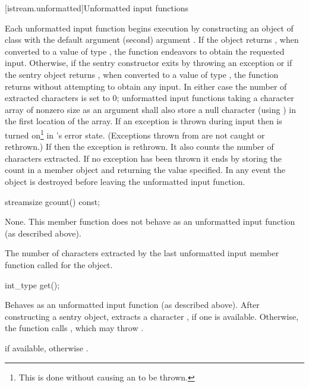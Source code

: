 [istream.unformatted]{Unformatted input functions}

\pnum
Each unformatted input function begins execution by constructing an object of class
with the default argument
(second) argument
.
If the
object returns
,
when converted to a value of type
,
the function endeavors
to obtain the requested input.
Otherwise, if the sentry constructor exits by throwing an exception or if
the sentry object returns , when converted to a value of type
,
the function returns without attempting to obtain any input.
In either case the number of extracted characters is set to 0;
unformatted input functions taking a character array of nonzero size as
an argument shall also store a null character (using
)
in the first location of the array.
If an exception is thrown during input then
is turned on\footnote{This is done without causing an
to be thrown.}
in
's
error state.
(Exceptions thrown from
are not caught or rethrown.)
If
then the exception is rethrown.
It also counts the number of characters extracted.
If no exception has been thrown it ends
by storing the count in a member object
and returning the value specified.
In any event the
object
is destroyed before leaving the unformatted input function.

%
\begin{itemdecl}
streamsize gcount() const;
\end{itemdecl}

\begin{itemdescr}
\pnum
\effects
None.
This member function does not behave as an unformatted
input function (as described above).

\pnum
\returns
The number of characters
extracted by the last unformatted input member function called for the object.
\end{itemdescr}

%
\begin{itemdecl}
int_type get();
\end{itemdecl}

\begin{itemdescr}
\pnum
\effects
Behaves as an unformatted input function
(as described above).
After constructing a sentry object, extracts
a character , if one is available.
Otherwise, the function calls
,
which may throw
.

\pnum
\returns
{} if available,
otherwise
.
\end{itemdescr}

